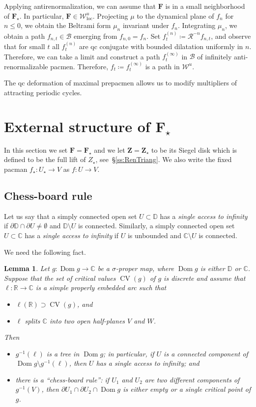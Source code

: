 \documentclass{amsart}
\newcommand{\Dom}{\operatorname {Dom}}
\newcommand{\1}{{\mathbb 1 }}
\newcommand\RR{\mathcal{R}}
\newcommand{\bF}{{\mathbf F}}
\newcommand{\bZ}{{\mathbf Z}}
\newcommand{\str}{{\star}}
\def\loc{{\mathrm{loc}}}
\newcommand\WW{\mathcal{W}}
\newcommand\UnstLoc{{\boldsymbol{\mathcal{W}}^u_\loc}}
\newcommand\BB{\mathcal{B}}
\newcommand{\C}{\mathbb{C}}
\newcommand{\R}{\mathbb{R}}
\newcommand{\Disk}{\mathbb{D}}
\newtheorem{lem}[thm]{Lemma}
\theoremstyle{remark}
\numberwithin{equation}{section}
\theoremstyle{definition}
\newcommand{\CV}{{\operatorname{CV}}}
\theoremstyle{nonumberbreak}
\begin{document}
Applying antirenormalization, we can assume that $\bF$ is in a small neighborhood of $\bF_\str$. In particular, $\bF\in \UnstLoc$. Projecting $\mu$ to the dynamical plane of $f_n$ for $n\le 0$, we obtain the Beltrami form $\mu_n$ invariant under $f_n$. Integrating $\mu_n$, we obtain a path $f_{n,t}\in \BB$ emerging from $f_{n,0}=f_n$. Set $f_{t}^{(n)}\coloneqq \RR^{-n} f_{n,t}$, and observe that for small $t$ all $f^{(n)}_t$ are qc conjugate with bounded dilatation uniformly in $n$. Therefore, we can take a limit and construct a path $f^{(\infty)}_t$ in $\BB$ of infinitely anti-renormalizable pacmen. Therefore,  $f_t\coloneqq f^{(\infty)}_t$ is a path in $\WW^u$.

The qc deformation of maximal prepacmen allows us to modify multipliers of attracting periodic cycles.



\section{External structure of $\bF_\str$}
\label{s:Dyn F_str}
In this section we set $\bF=\bF_\str$ and we let $\bZ=\bZ_\str$ to be its Siegel disk which is defined to be the full lift of $Z_\str$, see~\S\ref{ss:RenTriang}.  We also write the fixed pacman $f_\str \colon U_\str\to V$ as $f \colon U\to V$.

\subsection{Chess-board rule} Let us say that a simply connected open set $U\subset \Disk$ has a \emph{single access to infinity} if $ \partial \Disk\cap \partial U\not= \emptyset$ and $\Disk\setminus U$ is connected. Similarly, a simply connected open set $U\subset \C$ has a \emph{single access to infinity} if $U$ is unbounded and $\C\setminus U$ is connected.  


We need the following fact.

\begin{lem}
\label{lem:chess board}
Let $g\colon \Dom g \to \C$ be a $\sigma$-proper map, where $\Dom g$ is either $\Disk$ or $\C$. Suppose that the set of critical values $\CV(g)$ of $g$ is discrete and assume that $\ell\colon \R\to \C $ is a simple properly embedded arc such that
\begin{itemize}
\item[1)] $\ell(\R)\supset \CV(g)$, and 
\item[2)] $\ell$ splits $\C$ into two open half-planes $V$ and $W$.
\end{itemize} 

Then 
\begin{itemize}
\item $g^{-1}(\ell)$ is a tree in $\Dom g$; in particular, if $U$ is a connected component of $\Dom g \setminus g^{-1}(\ell)$, then $U$ has a single access to infinity; and
\item there is a ``chess-board rule'': if $U_1$ and $U_2$ are two different components of $g^{-1}(V)$, then $\partial U_1\cap \partial U_2\cap \Dom g$ is either empty or a single critical point of $g$. 
\end{itemize}
\end{lem}
\end{document}
